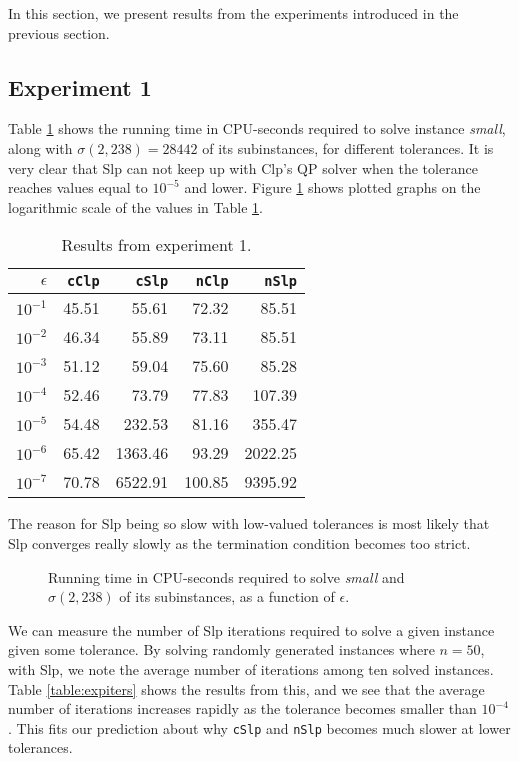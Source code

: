 In this section, we present results from the experiments introduced in the
previous section.

\subsection*{Experiment 1}
Table \ref{table:expone} shows the running time in CPU-seconds required
to solve instance \textit{small}, along with $\sigma(2, 238) = 28442$ of its
subinstances, for different tolerances.
It is very clear that Slp can not
keep up with Clp's QP solver when the tolerance reaches values equal to
$10^{-5}$ and lower.
Figure \ref{fig:smalltolerance} shows plotted graphs on the logarithmic scale
of the values in Table \ref{table:expone}.

\begin{table}[ht!]
\centering
\caption{Results from experiment 1.}
\begin{tabular}{rrrrr}
$\epsilon$ & \texttt{cClp} & \texttt{cSlp} & \texttt{nClp} & \texttt{nSlp} \\ \hline
$10^{-1}$ & 45.51 & 55.61 & 72.32 & 85.51 \\
$10^{-2}$ & 46.34 & 55.89 & 73.11 & 85.51 \\
$10^{-3}$ & 51.12 & 59.04 & 75.60 & 85.28 \\
$10^{-4}$ & 52.46 & 73.79 & 77.83 & 107.39 \\
$10^{-5}$ & 54.48 & 232.53 & 81.16 & 355.47 \\
$10^{-6}$ & 65.42 & 1363.46 & 93.29 & 2022.25 \\
$10^{-7}$ & 70.78 & 6522.91 & 100.85 & 9395.92
\end{tabular}
\label{table:expone}
\end{table}

The reason for Slp being so slow with low-valued tolerances is most likely that
Slp converges really slowly as the termination condition becomes too strict.
\begin{figure}[ht!]
    \centering
    
    \caption{Running time in CPU-seconds required to solve \textit{small}
             and $\sigma(2, 238)$ of its subinstances, as a function of $\epsilon$.}
    \label{fig:smalltolerance}
\end{figure}
We can measure the number of Slp iterations required to solve a given instance
given some tolerance. By solving randomly generated instances where $n = 50$,
with Slp, we note the average number of iterations among ten solved
instances. Table \ref{table:expiters} shows the results from this, and we see
that the average number of iterations increases rapidly as the tolerance
becomes smaller than $10^{-4}$. This fits our prediction about why
\texttt{cSlp} and \texttt{nSlp} becomes much slower at lower tolerances.

